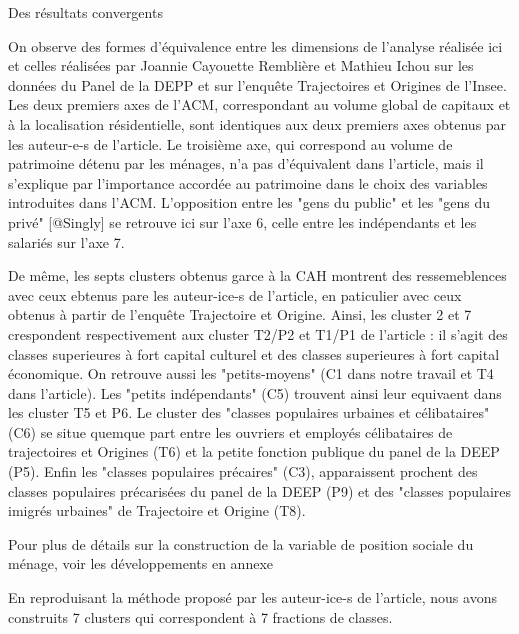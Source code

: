 \documentclass[
  12pt,
]{book}
\begin{document}
\begin{encadre}{Des résultats convergents}


On observe des formes d'équivalence entre les dimensions de l'analyse réalisée ici et celles réalisées par Joannie Cayouette Remblière et Mathieu Ichou sur les données du Panel de la DEPP et sur l'enquête Trajectoires et Origines de l'Insee. Les deux premiers axes de l'ACM, correspondant au volume global de capitaux et à la localisation résidentielle, sont identiques aux deux premiers axes obtenus par les auteur-e-s de l'article. Le troisième axe, qui correspond au volume de patrimoine détenu par les ménages, n'a pas d'équivalent dans l'article, mais il s'explique par l'importance accordée au patrimoine dans le choix des variables introduites dans l'ACM. L'opposition entre les "gens du public" et les "gens du privé" [@Singly] se retrouve ici sur l'axe 6, celle entre les indépendants et les salariés sur l'axe 7. 

De même, les septs clusters obtenus garce à la CAH montrent des ressemeblences avec ceux ebtenus pare les auteur-ice-s de l'article, en paticulier avec ceux obtenus à partir de l'enquête Trajectoire et Origine. Ainsi, les cluster 2 et 7 crespondent respectivement aux cluster T2/P2 et T1/P1 de l'article : il s'agit des classes superieures à fort capital culturel et des classes superieures à fort capital économique. On retrouve aussi les "petits-moyens" (C1 dans notre travail et T4 dans l'article). Les "petits indépendants" (C5) trouvent ainsi leur equivaent dans les cluster T5 et P6. Le cluster des "classes populaires urbaines et célibataires" (C6) se situe quemque part entre les ouvriers et employés célibataires de trajectoires et Origines (T6) et la petite fonction publique du panel de la DEEP (P5). Enfin les "classes populaires précaires" (C3), apparaissent prochent des classes populaires précarisées du panel de la DEEP (P9) et des "classes populaires imigrés urbaines" de Trajectoire et Origine (T8).


Pour plus de détails sur la construction de la variable de position sociale du ménage, voir les développements en annexe

\end{encadre}

En reproduisant la méthode proposé par les auteur-ice-s de l'article,
nous avons construits 7 clusters qui correspondent à 7 fractions de
classes.
\end{document}

